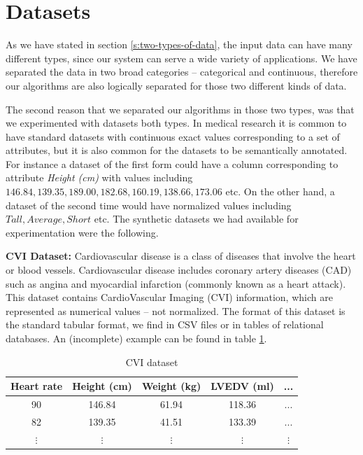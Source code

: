 \section{Datasets  }\label{s:datasets}
As we have stated in section \ref{s:two-types-of-data}, the input data can have many different types, since our system can serve a wide variety of applications.
We have separated the data in two broad categories -- categorical and continuous, therefore our algorithms are also logically separated for those two different kinds of data.

The second reason that we separated our algorithms in those two types, was that we experimented with datasets both types.
In medical research it is common to have standard datasets with continuous exact values corresponding to a set of attributes, but it is also common for the datasets to be semantically annotated.
For instance a dataset of the first form could have a column corresponding to attribute \textit{Height (cm)} with values including $146.84, 139.35, 189.00, 182.68, 160.19, 138.66, 173.06$ etc.
On the other hand, a dataset of the second time would have normalized values including $Tall, Average, Short$ etc.
The synthetic datasets we had available for experimentation were the following.

\textbf{CVI Dataset:}
Cardiovascular disease is a class of diseases that involve the heart or blood vessels.
Cardiovascular disease includes coronary artery diseases (CAD) such as angina and myocardial infarction (commonly known as a heart attack).
This dataset contains CardioVascular Imaging (CVI) information, which are represented as numerical values – not normalized.
The format of this dataset is the standard tabular format, we find in CSV files or in tables of relational databases.
An (incomplete) example can be found in table \ref{t:cvi}.

\begin{table}[H]
  \centering
  \caption{CVI dataset}
  \label{t:cvi}
\begin{center}
  \begin{tabular}{ c | c | c | c | c}
    Heart rate & Height (cm) & Weight (kg) & LVEDV (ml) & ... \\
   \hline
   90 & 146.84 & 61.94 & 118.36 & ... \\
   82 & 139.35 & 41.51 & 133.39 & ... \\
   $\vdots$ & $\vdots$ & $\vdots$ & $\vdots$ & $\vdots$ \\
  \end{tabular}
\end{center}
\end{table}

